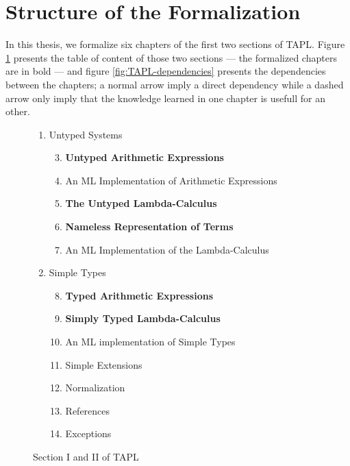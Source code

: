 \section{Structure of the Formalization}
\label{sec:structure-of-formalization}

In this thesis, we formalize six chapters of the first two sections of TAPL. Figure
\ref{fig:TAPL-toc} presents the table of content of those two sections --- the formalized chapters
are in bold --- and figure \ref{fig:TAPL-dependencies} presents the dependencies between the
chapters; a normal arrow imply a direct dependency while a dashed arrow only imply that the
knowledge learned in one chapter is usefull for an other.

\begin{figure}[h]
  \footnotesize
  \centering
  \begin{varwidth}{\textwidth}
    \begin{enumerate}[label=\Roman*]
      \itemsep 1pt
      \item Untyped Systems \hfill
        \begin{enumerate}[label=§ \arabic*]
          \setcounter{enumii}{2}
          \item \textbf{Untyped Arithmetic Expressions}
          \item An ML Implementation of Arithmetic Expressions
          \item \textbf{The Untyped Lambda-Calculus}
          \item \textbf{Nameless Representation of Terms}
          \item An ML Implementation of the Lambda-Calculus
        \end{enumerate}
      \item Simple Types \hfill
        \begin{enumerate}[label=§ \arabic*]
          \setcounter{enumii}{7}
          \item \textbf{Typed Arithmetic Expressions}
          \item \textbf{Simply Typed Lambda-Calculus}
          \item An ML implementation of Simple Types
          \item Simple Extensions
          \item Normalization
          \item References
          \item Exceptions
        \end{enumerate}
    \end{enumerate}
  \end{varwidth}
  \caption{Section I and II of TAPL}
  \label{fig:TAPL-toc}
\end{figure}


